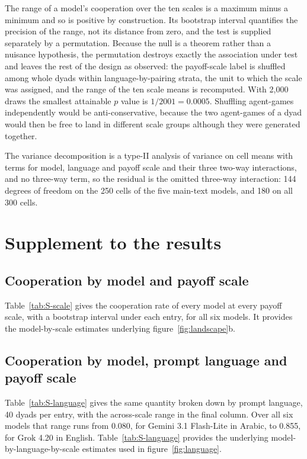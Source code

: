 \documentclass[11pt,a4paper]{article}
\begin{document}
The range of a model's cooperation over the ten scales is a maximum minus a
minimum and so is positive by construction. Its bootstrap interval quantifies
the precision of the range, not its distance from zero, and the test is
supplied separately by a permutation. Because the null is a theorem rather than
a nuisance hypothesis, the permutation destroys exactly the association under
test and leaves the rest of the design as observed: the payoff-scale label is
shuffled among whole dyads within language-by-pairing strata, the unit to which
the scale was assigned, and the range of the ten scale means is recomputed.
With 2{,}000 draws the smallest attainable $p$ value is $1/2001 = 0.0005$.
Shuffling agent-games independently would be anti-conservative, because the two
agent-games of a dyad would then be free to land in different scale groups
although they were generated together.

The variance decomposition is a type-II analysis of variance on cell means with
terms for model, language and payoff scale and their three two-way
interactions, and no three-way term, so the residual is the omitted three-way
interaction: 144 degrees of freedom on the 250 cells of the five main-text
models, and 180 on all 300 cells.


\section{Supplement to the results}\label{appendix:results}

\subsection{Cooperation by model and payoff scale}\label{appendix:by_scale}

Table~\ref{tab:S-scale} gives the cooperation rate of every model at every
payoff scale, with a bootstrap interval under each entry, for all six models.
It provides the model-by-scale estimates underlying figure~\ref{fig:landscape}b.

\subsection{Cooperation by model, prompt language and payoff scale}\label{appendix:by_language}

Table~\ref{tab:S-language} gives the same quantity broken down by prompt
language, 40 dyads per entry, with the across-scale range in the final column.
Over all six models that range runs from 0.080, for Gemini 3.1 Flash-Lite in
Arabic, to 0.855, for Grok 4.20 in English. Table~\ref{tab:S-language}
provides the underlying model-by-language-by-scale estimates used in
figure~\ref{fig:language}.
\end{document}
